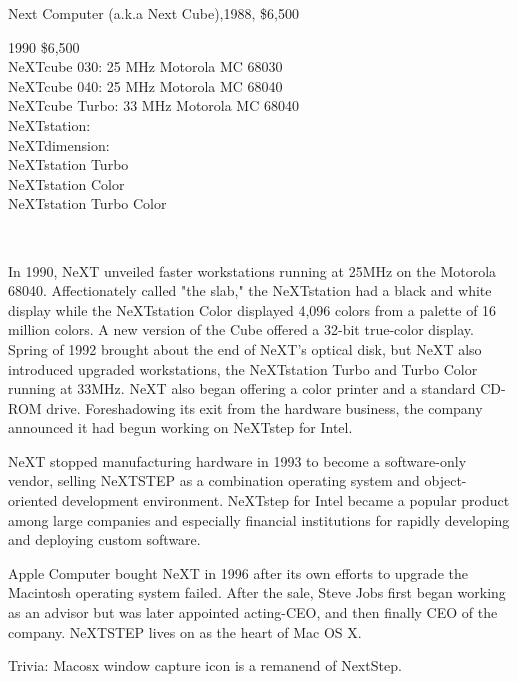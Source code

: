 Next Computer (a.k.a Next Cube),1988, \$6,500\\
\par
1990 \$6,500\\
NeXTcube 030: 25 MHz Motorola MC 68030\\
NeXTcube 040: 25 MHz Motorola MC 68040\\
NeXTcube Turbo: 33 MHz Motorola MC 68040\\
NeXTstation:\\
NeXTdimension:\\
NeXTstation Turbo\\
NeXTstation Color\\
NeXTstation Turbo Color\\
\par
{}
\par
{}\\
\begin{minipage}{\textwidth}
 
\end{minipage}
\par
In 1990, NeXT unveiled faster workstations running at 25MHz on the Motorola 68040. Affectionately called "the slab," the NeXTstation had a black and white display while the NeXTstation Color displayed 4,096 colors from a palette of 16 million colors. A new version of the Cube offered a 32-bit true-color display.
Spring of 1992 brought about the end of NeXT's optical disk, but NeXT also introduced upgraded workstations, the NeXTstation Turbo and Turbo Color running at 33MHz. NeXT also began offering a color printer and a standard CD-ROM drive. Foreshadowing its exit from the hardware business, the company announced it had begun working on NeXTstep for Intel.\\
\par
{}
\par
NeXT stopped manufacturing hardware in 1993 to become a software-only vendor, selling NeXTSTEP as a combination operating system and object-oriented development environment. NeXTstep for Intel became a popular product among large companies and especially financial institutions for rapidly developing and deploying custom software. \\
\par
Apple Computer bought NeXT in 1996 after its own efforts to upgrade the Macintosh operating system failed.  After the sale, Steve Jobs first began working as an advisor but was later appointed acting-CEO, and then finally CEO of the company.  NeXTSTEP lives on as the heart of Mac OS X.\\
\par
{}
\par
Trivia: Macosx window capture icon is a remanend of NextStep.